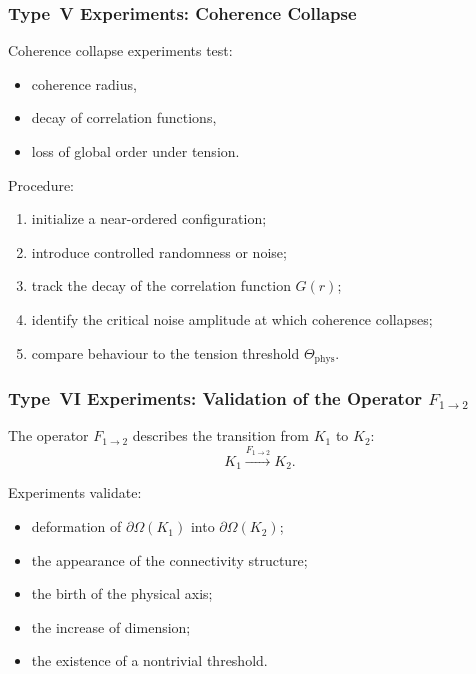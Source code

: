 \subsubsection{Type~V Experiments: Coherence Collapse}

Coherence collapse experiments test:

\begin{itemize}
    \item coherence radius,
    \item decay of correlation functions,
    \item loss of global order under tension.
\end{itemize}

Procedure:

\begin{enumerate}
    \item initialize a near-ordered configuration;
    \item introduce controlled randomness or noise;
    \item track the decay of the correlation function $G(r)$;
    \item identify the critical noise amplitude at which coherence 
          collapses;
    \item compare behaviour to the tension threshold $\Theta_{\mathrm{phys}}$.
\end{enumerate}



\subsubsection{Type~VI Experiments: Validation of the Operator $F_{1\rightarrow 2}$}

The operator $F_{1\rightarrow 2}$ describes the transition from $K_1$ to $K_2$:
\[
   K_1 \xrightarrow{F_{1\rightarrow 2}} K_2.
\]

Experiments validate:

\begin{itemize}
    \item deformation of $\partial\Omega(K_1)$ into 
          $\partial\Omega(K_2)$;
    \item the appearance of the connectivity structure;
    \item the birth of the physical axis;
    \item the increase of dimension;
    \item the existence of a nontrivial threshold.
\end{itemize}

